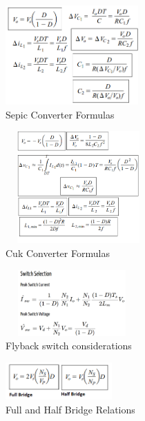 \documentclass[twocolumn, ]{article}
\begin{document}


\begin{figure}[!ht]
	\includegraphics[width=2in,height=1.5in]{sepicformulas.png}
	\caption{Sepic Converter Formulas}
\end{figure}
\begin{figure}[!ht]
	\includegraphics[width=2.2in,height=1.7in]{cukformulas.png}
	\caption{Cuk Converter Formulas}
\end{figure}

  \begin{figure}[!ht]
	\includegraphics[width=2in,height=1in]{flybak_switch}
	\caption{Flyback switch considerations}
\end{figure}

\begin{figure}[!ht]
	\includegraphics[width=1.6in,height=.6in]{fullandhalfinout.png}
	\caption{Full and Half Bridge Relations}
\end{figure}
\end{document}
